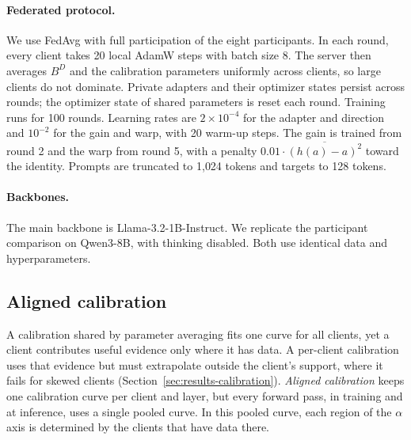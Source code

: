 \documentclass[11pt]{article}
\begin{document}
\paragraph{Federated protocol.}
We use FedAvg with full participation of the eight participants.
In each round, every client takes 20 local AdamW steps with batch size 8.
The server then averages $B^{D}$ and the calibration parameters uniformly across clients, so large clients do not dominate.
Private adapters and their optimizer states persist across rounds; the optimizer state of shared parameters is reset each round.
Training runs for 100 rounds.
Learning rates are $2\times10^{-4}$ for the adapter and direction and $10^{-2}$ for the gain and warp, with 20 warm-up steps.
The gain is trained from round 2 and the warp from round 5, with a penalty $0.01\cdot\overline{(h(a)-a)^2}$ toward the identity.
Prompts are truncated to 1{,}024 tokens and targets to 128 tokens.

\paragraph{Backbones.}
The main backbone is Llama-3.2-1B-Instruct.
We replicate the participant comparison on Qwen3-8B, with thinking disabled.
Both use identical data and hyperparameters.

\subsection{Aligned calibration}
\label{sec:setup-aligned}

A calibration shared by parameter averaging fits one curve for all clients, yet a client contributes useful evidence only where it has data.
A per-client calibration uses that evidence but must extrapolate outside the client's support, where it fails for skewed clients (Section~\ref{sec:results-calibration}).
\emph{Aligned calibration} keeps one calibration curve per client and layer, but every forward pass, in training and at inference, uses a single pooled curve.
In this pooled curve, each region of the $\alpha$ axis is determined by the clients that have data there.
\end{document}
